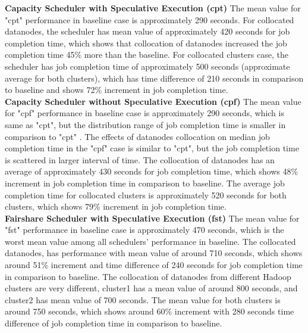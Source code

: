 \textbf{Capacity Scheduler with Speculative Execution (cpt)} The mean value for "cpt" performance in baseline case is approximately 290 seconds. For collocated datanodes, the scheduler has mean value of approximately 420 seconds for job completion time, which shows that collocation of datanodes increased the job completion time 45\% more than the baseline. For collocated clusters case, the scheduler has job completion time of approximately 500 seconds (approximate average for both clusters), which has time difference of 210 seconds in comparison to baseline and shows 72\% increment in job completion time.\\

\textbf{Capacity Scheduler without Speculative Execution (cpf)} The mean value for "cpf" performance  in baseline case is approximately 290 seconds, which is same as "cpt", but the distribution range of job completion time is smaller in comparison to "cpt" . The effects of datanodes collocation on median job completion time in the "cpf" case is similar to "cpt", but the job completion time is scattered in larger interval of time. The collocation of datanodes has an average of approximately 430 seconds for job completion time, which shows 48\% increment in job completion time in comparison to baseline. The average job completion time for collocated clusters is approximately 520 seconds for both clusters, which shows 79\% increment in job completion time. \\ 


\textbf{Fairshare Scheduler with Speculative Execution (fst)} The mean value for "fst" performance in  baseline case is approximately 470 seconds, which is the worst mean value among all schedulers' performance in baseline. The collocated datanodes, has performance with mean value of around 710 seconds, which shows around 51\% increment and time difference of 240 seconds for job completion time in comparison to baseline. The collocation of datanodes from different Hadoop clusters are very different, cluster1 has a mean value of around 800 seconds, and cluster2 has mean value of 700 seconds. The mean value for both clusters is around 750 seconds,  which shows around 60\% increment with 280 seconds time difference of job completion time in comparison to baseline.\\

